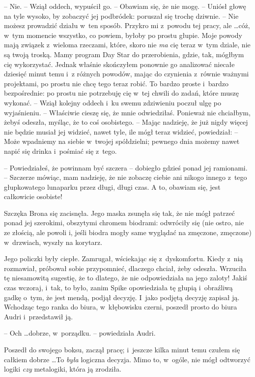 \documentclass[oneside,polish,11pt,rmheadings]{mwbk}
\begin{document}
-- Nie. -- Wziął oddech, wypuścił go. -- Obawiam się, że nie mogę. -- Uniósł głowę na tyle wysoko, by zobaczyć jej podbródek: poruszał się trochę dziwnie. -- Nie możesz prowadzić działu w~ten sposób. Przykro mi z~powodu tej pracy, ale \ldots  cóż, w~tym momencie wszystko, co powiem, byłoby po prostu głupie. Moje powody mają związek z~wieloma rzeczami, które, skoro nie \textit{ma }cię teraz w~tym dziale, nie są twoją troską. Mamy program Day Star do przerobienia, gdzie, tak, mógłbym cię wykorzystać. Jednak właśnie skończyłem ponownie go analizować niecałe dziesięć minut temu i~z różnych powodów, mając do czynienia z~równie ważnymi projektami, po prostu nie chcę tego teraz robić. To bardzo proste i~bardzo bezpośrednie: po prostu nie potrzebuję cię w~tej chwili do zadań, które muszę wykonać. -- Wziął kolejny oddech i~ku swemu zdziwieniu poczuł ulgę po wyjaśnieniu. -- Właściwie cieszę się, że mnie odwiedziłaś. Ponieważ nie chciałbym, żebyś odeszła, myśląc, że to coś osobistego. -- Mając nadzieję, że już nigdy więcej nie będzie musiał jej widzieć, nawet tyle, ile mógł teraz widzieć, powiedział: -- Może wpadniemy na siebie w~twojej spółdzielni; pewnego dnia możemy nawet napić się drinka i~pośmiać się z~tego. 

-- Powiedziałeś, że powinnam być szczera -- dobiegło gdzieś ponad jej ramionami. -- Szczerze mówiąc, mam nadzieję, że nie zobaczę ciebie ani nikogo innego z~tego głupkowatego lunaparku przez długi, długi czas. A to, obawiam się, jest całkowicie osobiste! 

Szczęka Brona się zacisnęła. Jego maska zsunęła się tak, że nie mógł patrzeć ponad jej szerokimi, obszytymi chromem biodrami: odwróciły się (nie ostro, nie ze złością, ale powoli i, jeśli biodra mogły same wyglądać na zmęczone, zmęczone) w~drzwiach, wyszły na korytarz. 

Jego policzki były ciepłe. Zamrugał, wściekając się z~dyskomfortu. Kiedy z~nią rozmawiał, próbował sobie przypomnieć, dlaczego chciał, żeby odeszła. Wrzuciła tę niesamowitą sugestię, że to dlatego, że nie odpowiedziała na jego zaloty! Jakiś czas wczoraj, i~tak, to było, zanim Spike opowiedziała tę głupią i~obraźliwą gadkę o~tym, że jest mendą, podjął decyzję. I~jako podjętą decyzję zapisał ją. Wchodząc tego ranka do biura, w~kłębowisku czerni, poszedł prosto do biura Audri i~przedstawił ją. 

-- Och \ldots  dobrze, w~porządku. -- powiedziała Audri. 

Poszedł do swojego boksu, zaczął pracę; i~jeszcze kilka minut temu czułem się całkiem dobrze \ldots  To \textit{była }logiczna decyzja. Mimo to, w~ogóle, nie mógł odtworzyć logiki \textit{czy }metalogiki, która ją zrodziła. 
\end{document}

